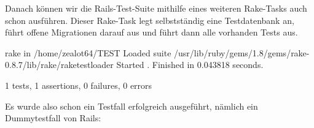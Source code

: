 Danach können wir die Rails-Test-Suite mithilfe eines weiteren Rake-Tasks auch schon ausführen. Dieser Rake-Task legt selbstständig eine Testdatenbank an, führt offene Migrationen darauf aus und führt dann alle vorhanden Tests aus.


%                                                                                                                                                      
%                                                                                                                                                      
\begin{ruby}[label=Shell]
rake 
in /home/zealot64/TEST
Loaded suite /usr/lib/ruby/gems/1.8/gems/rake-0.8.7/lib/rake/rake\PYZus{}test\PYZus{}loader
Started
.
Finished in 0.043818 seconds.

1 tests, 1 assertions, 0 failures, 0 errors
\end{ruby}


Es wurde also schon ein Testfall erfolgreich ausgeführt, nämlich ein Dummytestfall von Rails:

\begin{ruby}[label={test/units/job\_test.rb}]
 

   
    
     
\end{ruby}
\label{list:bla}


